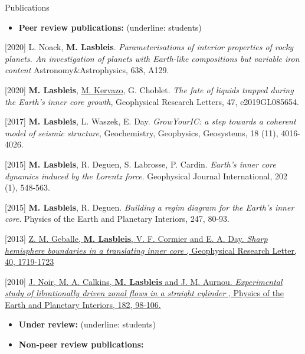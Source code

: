 \documentclass{cv}
\begin{document}
\begin{rubrique}{Publications}%

	\begin{itemize}
		\item \textbf{Peer review publications:} (underline: students)
	 \end{itemize}

	 [2020] L. Noack, \textbf{M. Lasbleis}. \textit{Parameterisations of interior properties of rocky planets. 
	 An investigation of planets with Earth-like compositions but variable iron content} Astronomy\&Astrophysics,  638, A129.


	 [2020] \textbf{M. Lasbleis}, \underline{M. Kervazo}, G. Choblet. \textit{The fate of liquids trapped during the Earth's inner core growth}, Geophysical Research Letters,  47, e2019GL085654.


	 [2017] \textbf{M. Lasbleis}, L. Waszek, E. Day. \textit{GrowYourIC: a step towards a coherent model of seismic
	structure}, Geochemistry, Geophysics, Geosystems, 18 (11), 4016-4026.


[2015] \textbf{M. Lasbleis}, R. Deguen, S. Labrosse, P. Cardin. \textit{Earth's inner core dynamics
	induced by the Lorentz force}. Geophysical Journal International,  202 (1), 548-563. 

[2015] \textbf{M. Lasbleis}, R. Deguen. \textit{Building a regim diagram for the Earth's inner
  core}. Physics of the Earth and Planetary Interiors,  247, 80-93.  

[2013] \href{http://onlinelibrary.wiley.com/doi/10.1002/grl.50372/abstract}{Z. M. Geballe,
  \textbf{M. Lasbleis}, V. F. Cormier and E. A. Day.  \textit{Sharp hemisphere
    boundaries in a translating inner core} , Geophysical Research Letter,   40, 1719-1723}

[2010] \href{http://www.sciencedirect.com/science/article/pii/S0031920110001329}{J. Noir,
  M. A. Calkins,  \textbf{M. Lasbleis} and J. M. Aurnou.  \textit{Experimental study
    of librationally driven zonal flows in a straight cylinder} ,
  Physics of the  Earth and Planetary Interiors,  182, 98-106.}

\newpage

  \begin{itemize}
	\item \textbf{Under review:} (underline: students)
\end{itemize}



\begin{itemize}
	\item \textbf{Non-peer review publications:}
\end{itemize}


\end{rubrique}
\end{document}
